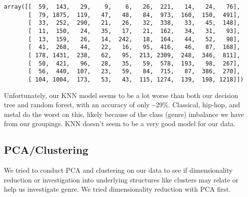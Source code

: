 \documentclass[11pt]{article}
\makeatletter
\newcommand{\boxspacing}{\kern\kvtcb@left@rule\kern\kvtcb@boxsep}
\newcommand{\prompt}[4]{
        {\ttfamily\llap{{\color{#2}[#3]:\hspace{3pt}#4}}\vspace{-\baselineskip}}
    }
\makeatother
\begin{document}
            \begin{tcolorbox}[breakable, size=fbox, boxrule=.5pt, pad at break*=1mm, opacityfill=0]
\prompt{Out}{outcolor}{132}{\boxspacing}
\begin{Verbatim}[commandchars=\\\{\}]
array([[  59,  143,   29,    9,    6,   26,  221,   14,   24,   76],
       [  79, 1875,  119,   47,   48,   84,  973,  160,  150,  491],
       [  33,  252,  290,   21,   26,   32,  338,   33,   45,  148],
       [  11,  150,   24,   35,   17,   21,  162,   34,   31,   93],
       [  13,  159,   26,   14,  242,   18,  164,   44,   52,   98],
       [  41,  268,   44,   22,   16,   95,  416,   46,   87,  168],
       [ 178, 1431,  238,   62,   95,  213, 2309,  248,  346,  811],
       [  50,  421,   96,   28,   35,   59,  578,  193,   98,  267],
       [  56,  440,  107,   23,   59,   84,  715,   87,  386,  270],
       [ 104, 1004,  173,   53,   43,  115, 1274,  139,  198, 1218]])
\end{Verbatim}
\end{tcolorbox}
        
    Unfortunately, our KNN model seems to be a lot worse than both our
decision tree and random forest, with an accuracy of only
\textasciitilde29\%. Classical, hip-hop, and metal do the worst on this,
likely because of the class (genre) imbalance we have from our
groupings. KNN doesn't seem to be a very good model for our data.

    \subsection{PCA/Clustering}\label{pcaclustering}

We tried to conduct PCA and clustering on our data to see if
dimensionality reduction or investigation into underlying structures
like clusters may relate or help us investigate genre. We tried
dimensionality reduction with PCA first.
\end{document}

